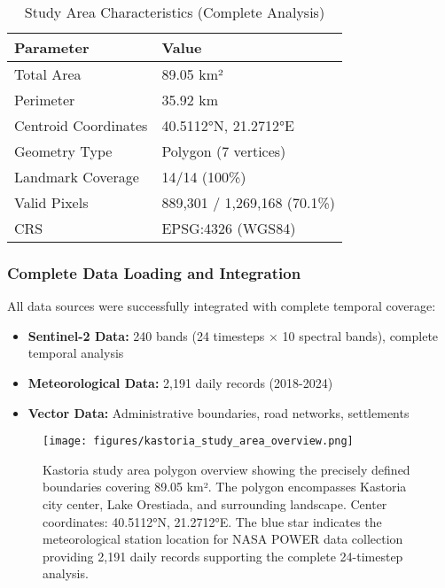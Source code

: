 \documentclass[a4paper,12pt]{article}
\begin{document}
\begin{table}[H]
    \centering
    \caption{Study Area Characteristics (Complete Analysis)}
    \begin{tabular}{@{}ll@{}}
        \toprule
        Parameter            & Value                \\
        \midrule
        Total Area           & 89.05 km²            \\
        Perimeter            & 35.92 km             \\
        Centroid Coordinates & 40.5112°N, 21.2712°E \\
        Geometry Type        & Polygon (7 vertices) \\
        Landmark Coverage    & 14/14 (100\%)        \\
        Valid Pixels         & 889,301 / 1,269,168 (70.1\%) \\
        CRS                  & EPSG:4326 (WGS84)    \\
        \bottomrule
    \end{tabular}
\end{table}

\subsubsection{Complete Data Loading and Integration}

All data sources were successfully integrated with complete temporal coverage:

\begin{itemize}
    \item \textbf{Sentinel-2 Data:} 240 bands (24 timesteps × 10 spectral bands), complete temporal analysis
    \item \textbf{Meteorological Data:} 2,191 daily records (2018-2024)
    \item \textbf{Vector Data:} Administrative boundaries, road networks, settlements
\end{itemize}

\begin{figure}[H]
    \centering
    \texttt{[image: figures/kastoria\_study\_area\_overview.png]}
    \caption{Kastoria study area polygon overview showing the precisely defined boundaries covering 89.05 km². The polygon encompasses Kastoria city center, Lake Orestiada, and surrounding landscape. Center coordinates: 40.5112°N, 21.2712°E. The blue star indicates the meteorological station location for NASA POWER data collection providing 2,191 daily records supporting the complete 24-timestep analysis.}
    \label{fig:study_area}
\end{figure}
\end{document}
